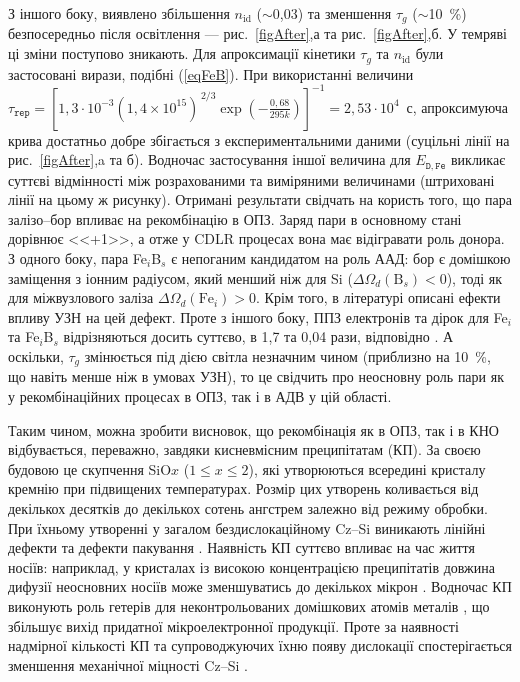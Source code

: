 З іншого боку, виявлено збільшення $n_{\mathrm{id}}$ ($\sim$0,03) та зменшення $\tau_g$ ($\sim$10~\%) безпосередньо після освітлення
--- рис.~\ref{figAfter},а та рис.~\ref{figAfter},б.
У темряві ці зміни поступово зникають.
Для апроксимації кінетики $\tau_g$ та $n_{\mathrm{id}}$ були застосовані вирази, подібні (\ref{eqFeB}).
При використанні величини $\tau_{\mathtt{rep}}=\left[1,3\cdot10^{-3}(1,4\times10^{15})^{\,2/3}\exp\left(-\frac{0,68}{295k}\right)\right]^{-1}=2,53\cdot10^4$~с,
апроксимуюча крива достатньо добре збігається з експериментальними даними
(суцільні лінії на рис.~\ref{figAfter},a та б).
Водночас застосування іншої величина для $E_{\mathtt{D,Fe}}$ викликає суттєві відмінності між розрахованими та виміряними величинами
(штриховані лінії на цьому ж рисунку).
Отримані результати свідчать на користь того, що пара залізо--бор впливає
на рекомбінацію в ОПЗ.
Заряд пари в основному стані дорівнює <<+1>>, а отже у CDLR процесах вона має відігравати роль донора.
З одного боку, пара Fe$_i$B$_s$ є непоганим кандидатом на роль ААД:
бор є домішкою заміщення з іонним радіусом, який менший ніж для Si ($\Delta\Omega_d (\mbox{B}_s)<0$),
тоді як для міжвузлового заліза $\Delta\Omega_d (\mbox{Fe}_i)>0$.
Крім того,  в літературі \cite{Ostapenko1995,OlikhFTT} описані ефекти впливу УЗН на цей дефект.
Проте з іншого боку, ППЗ електронів та дірок для Fe$_i$ та Fe$_i$B$_s$ відрізняються досить суттєво, в 1,7 та 0,04 рази, відповідно \cite{MurphyJAP2011}.
А оскільки, $\tau_g$ змінюється під дією світла незначним чином (приблизно на 10~\%, що навіть менше ніж в умовах УЗН), то це свідчить про
неосновну роль пари як у рекомбінаційних процесах в ОПЗ, так і в АДВ у цій області.


Таким чином, можна зробити висновок, що рекомбінація як в ОПЗ, так і в КНО відбувається, переважно,
завдяки кисневмісним преципітатам (КП).
За своєю будовою  це скупчення SiO$x$ ($1\leq x\leq2$), які утворюються всередині кристалу кремнію при підвищених температурах.
Розмір цих утворень коливається від декількох десятків до декількох сотень ангстрем залежно від режиму обробки.
При їхньому утворенні у загалом бездислокаційному Cz--Si виникають лінійні дефекти та дефекти пакування \cite{SiO:Hwang,SiO:Vanhell}.
Наявність КП суттєво впливає на час життя носіїв:
наприклад, у кристалах із високою концентрацією преципітатів довжина дифузії неосновних носіїв може зменшуватись до декількох мікрон \cite{SiO:Hwang}.
Водночас КП виконують роль гетерів для неконтрольованих домішкових атомів металів \cite{APR:Oxigen,MSER74},
що збільшує вихід придатної мікроелектронної продукції.
Проте за наявності надмірної кількості КП та супроводжуючих їхню появу дислокації
спостерігається зменшення механічної міцності Cz--Si \cite{MSER74}.


